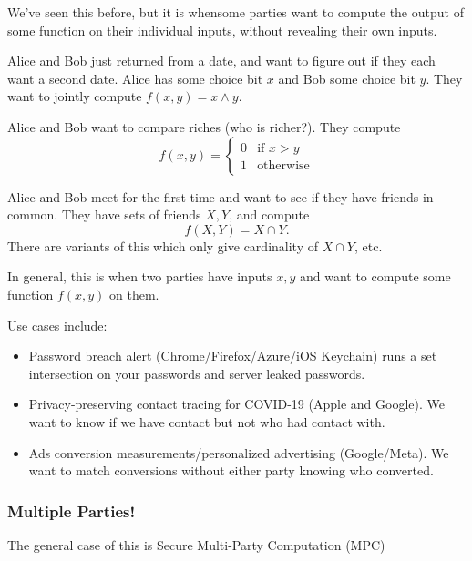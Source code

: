 We've seen this before, but it is whensome parties want to compute the output of some function on their individual inputs, without revealing their own inputs.

\begin{example}
    Alice and Bob just returned from a date, and want to figure out if they each want a second date. Alice has some choice bit $x$ and Bob some choice bit $y$. They want to jointly compute $f(x, y) = x\land y$.
\end{example}
\begin{example}
    Alice and Bob want to compare riches (who is richer?). They compute
    \[f(x, y) = \begin{cases}
            0 & \text{if }x>y    \\
            1 & \text{otherwise}
        \end{cases}\]
\end{example}
\begin{example}
    Alice and Bob meet for the first time and want to see if they have friends in common. They have sets of friends $X,Y$, and compute
    \[f(X, Y) = X\cap Y.\]
    There are variants of this which only give cardinality of $X\cap Y$, etc.
\end{example}


In general, this is when two parties have inputs $x, y$ and want to compute some function $f(x, y)$ on them.

Use cases include:
\begin{itemize}
    \item Password breach alert (Chrome/Firefox/Azure/iOS Keychain) runs a set intersection on your passwords and server leaked passwords.
    \item Privacy-preserving contact tracing for COVID-19 (Apple and Google). We want to know if we have contact but not who had contact with.
    \item Ads conversion measurements/personalized advertising (Google/Meta). We want to match conversions without either party knowing who converted.
\end{itemize}

\subsubsection{Multiple Parties!}
The general case of this is Secure Multi-Party Computation (MPC)


